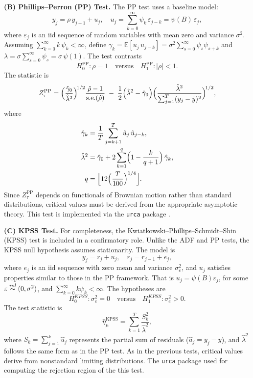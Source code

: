 \documentclass[10pt,a4paper,oneside]{article}
\begin{document}
\noindent \textbf{(B) Phillips--Perron (PP) Test.}
The PP test uses a baseline model:
\[
y_j 
= 
\rho\,y_{j - 1} + u_j, 
\quad 
u_j 
= 
\sum_{k=0}^{\infty} \psi_k \,\varepsilon_{j - k} 
= 
\psi(B)\,\varepsilon_j,
\]
where \(\varepsilon_j\) is an iid sequence of random variables with mean zero and variance \(\sigma^2\). Assuming \(\sum_{k=0}^{\infty} k\,\psi_k < \infty\), define 
\(\gamma_k = \mathbb{E}[u_j \,u_{j-k}] = \sigma^2 \sum_{s=0}^{\infty} \psi_s \psi_{s + k}\) and 
\(\lambda = \sigma \sum_{s=0}^{\infty} \psi_s = \sigma\,\psi(1)\). The test contrasts
\[
H_0^{\text{PP}}: \rho = 1 
\quad \text{versus} \quad
H_1^{\text{PP}}: |\rho| < 1.
\]
The statistic is
\[
Z_{\tau}^{\text{PP}} 
= 
\Bigl(\frac{\hat{\gamma}_0}{\hat{\lambda}^2}\Bigr)^{\!1/2}
\frac{\hat{\rho} - 1}{\text{s.e.}(\hat{\rho})}
\;-\;
\frac{1}{2}\Bigl(\hat{\lambda}^2 - \hat{\gamma}_0\Bigr)
\Bigl(\frac{\hat{\lambda}^2}{\sum_{j=1}^{T}(y_j - \bar{y})^2}\Bigr)^{\!1/2},
\]
where 
\begin{align*}
\hat{\gamma}_k 
&= 
\frac{1}{T} \sum_{j=k+1}^{T} \hat{u}_j\,\hat{u}_{j - k},\\
\hat{\lambda}^2 
&= 
\hat{\gamma}_0 
+ 
2 \sum_{k=1}^{q} \Bigl(1 - \frac{k}{q+1}\Bigr)\,\hat{\gamma}_k,\\
q 
&= 
\Bigl\lfloor 12 \Bigl(\frac{T}{100}\Bigr)^{1/4}\Bigr\rfloor.
\end{align*}
Since \(Z_{\tau}^{\text{PP}}\) depends on functionals of Brownian motion rather than standard distributions, critical values must be derived from the appropriate asymptotic theory. This test is implemented via the \verb|urca| package \cite{urca}.

\noindent \textbf{(C) KPSS Test.}
For completeness, the Kwiatkowski--Phillips--Schmidt--Shin (KPSS) test \cite{kwiatkowski1992testing} is included in a confirmatory role. Unlike the ADF and PP tests, the KPSS null hypothesis assumes stationarity. The model is
\[
y_j 
= 
r_j + u_j,
\quad
r_j 
= 
r_{j - 1} + e_j,
\]
where \(e_j\) is an iid sequence with zero mean and variance \(\sigma^2_e\), and \(u_j\) satisfies properties similar to those in the PP framework. That is $u_j = \psi(B) \varepsilon_j$, for some $\varepsilon \overset{iid}{\thicksim} (0, \sigma^2)$, and $\sum^{\infty}_{k = 0} k \psi_k < \infty$. The hypotheses are
\[
H^{KPSS}_0: \sigma_{e}^2 = 0 
\quad\text{versus}\quad 
H^{KPSS}_1: \sigma_{e}^2 > 0.
\]
The test statistic is
\[
\hat{\eta}_{\mu}^{\text{KPSS}} 
= 
\sum_{k=1}^{T} 
\frac{S_k^2}{\hat{\lambda}^2},
\]
where \(S_k = \sum_{j=1}^{k} \hat{u}_j\) represents the partial sum of residuals 
(\(\hat{u}_j = y_j - \bar{y}\)), and \(\hat{\lambda}^2\) follows the same form as in the PP test. As in the previous tests, critical values derive from nonstandard limiting distributions. The \verb|urca| package used for computing the rejection region of the this test.
\end{document}
